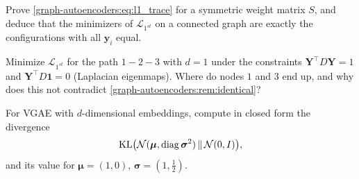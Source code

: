\begin{notechapter}
\begin{exercise}\label{graph-autoencoders:exr:2}
Prove \cref{graph-autoencoders:eq:l1_trace} for a symmetric weight matrix $S$, and deduce that the minimizers of $\mathcal L_{1^{st}}$ on a connected graph are exactly the configurations with all $\bm y_i$ equal.
\end{exercise}

\begin{exercise}\label{graph-autoencoders:exr:3}
Minimize $\mathcal L_{1^{st}}$ for the path $1 - 2 - 3$ with $d = 1$ under the constraints $\bm Y^\top D\bm Y = 1$ and $\bm Y^\top D\mathbf 1 = 0$ (Laplacian eigenmaps). Where do nodes $1$ and $3$ end up, and why does this not contradict \cref{graph-autoencoders:rem:identical}?
\end{exercise}

\begin{exercise}\label{graph-autoencoders:exr:4}
For VGAE with $d$-dimensional embeddings, compute in closed form the divergence
\[
\mathrm{KL}\bigl(\mathcal N(\boldsymbol\mu, \operatorname{diag}\boldsymbol\sigma^2)\,\|\,\mathcal N(0, I)\bigr),
\] and its value for $\boldsymbol\mu = (1, 0)$, $\boldsymbol\sigma = (1, \frac12)$.
\end{exercise}

\end{notechapter}
